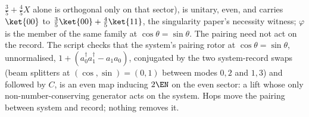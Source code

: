 $\tfrac35 + \tfrac45 X$ alone is orthogonal only on that sector), is unitary, even, and carries $\ket{00}$ to $\tfrac35\ket{00} + \tfrac45\ket{11}$, the singularity paper's necessity witness; $\varphi$ is the member of the same family at $\cos\theta = \sin\theta$. The pairing need not act on the record. The script checks that the system's pairing rotor at $\cos\theta = \sin\theta$, unnormalised, $1 + (a^{\dagger}_{0}a^{\dagger}_{1} - a_{1}a_{0})$, conjugated by the two system-record swaps (beam splitters at $(\cos, \sin) = (0, 1)$ between modes $0, 2$ and $1, 3$) and followed by $C$, is an even map inducing $2\EN$ on the even sector: a lift whose only non-number-conserving generator acts on the system. Hops move the pairing between system and record; nothing removes it.

